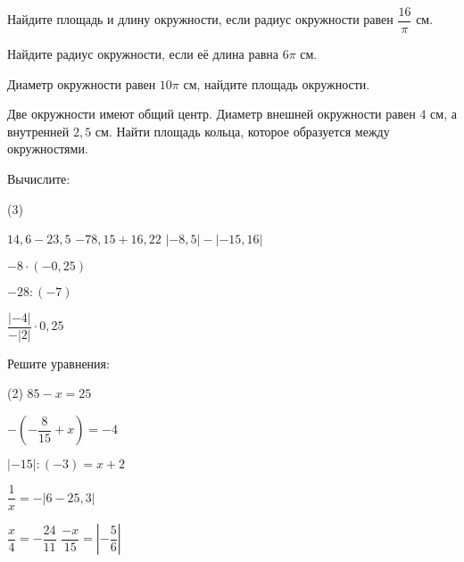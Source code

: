 \begin{homework}[number=2]
	\begin{listofex}
		\item Найдите площадь и длину окружности, если радиус окружности равен \( \dfrac{16}{\pi} \) см.
		\item Найдите радиус окружности, если её длина равна \( 6\pi \) см.
		\item Диаметр окружности равен \(10\pi\) см, найдите площадь окружности.
		\item Две окружности имеют общий центр. Диаметр внешней окружности равен \(4\) см, а внутренней \(2,5\) см. Найти площадь кольца, которое образуется между окружностями.
		\item Вычислите:
		\begin{tasks}(3)
			
			\task \( 14,6-23,5 \)
			\task \( -78,15 + 16,22 \)
			\task \( |-8,5| - |-15,16| \)
			
			\task \( -8 \cdot (-0,25)\)
			
			\task \( -28 : (-7) \)
			
			\task \( \dfrac{|-4|}{-|2|} \cdot 0,25 \)
			
		\end{tasks}
		\item Решите уравнения:
		\begin{tasks}(2)
			\task \( 85-x=25 \)
			
			\task \( -\left( -\dfrac{8}{15} + x \right) = -4 \)
			
			\task \( |-15|:(-3)=x+2 \)
			
			\task \( \dfrac{1}{x} = -|6-25,3| \)
			
			\task \( \dfrac{x}{4} = -\dfrac{24}{11} \)
			\task \( \dfrac{-x}{15} = \left| -\dfrac{5}{6} \right| \)
		\end{tasks}
	\end{listofex}
\end{homework}


